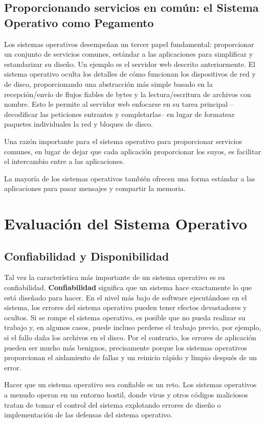 \documentclass[10pt]{book}
\begin{document}
\subsection{Proporcionando servicios en común: el Sistema Operativo como Pegamento}
Los sistemas operativos desempeñan un tercer papel fundamental: proporcionar un conjunto de servicios comunes, estándar a las aplicaciones para simplificar y estandarizar su diseño. Un ejemplo es el servidor web descrito anteriormente. El sistema operativo oculta los detalles de cómo funcionan los dispositivos de red y de disco, proporcionando una abstracción más simple basado en la recepción/envío de flujos fiables de bytes y la lectura/escritura de archivos con nombre. Esto le permite al servidor web enfocarse en su tarea principal --decodificar las peticiones entrantes y completarlas-- en lugar de formatear paquetes individuales la red y bloques de disco.

Una razón importante para el sistema operativo para proporcionar servicios comunes, en lugar de dejar que cada aplicación proporcionar los suyos, es facilitar el intercambio entre a las aplicaciones.


La mayoría de los sistemas operativos también ofrecen una forma estándar a las aplicaciones para pasar mensajes y compartir la memoria.


\section{Evaluación del Sistema Operativo}

\subsection{Confiabilidad y Disponibilidad}
Tal vez la característica más importante de un sistema operativo es su confiabilidad. \textbf{Confiabilidad} significa que un sistema hace exactamente lo que está diseñado para hacer. En el nivel más bajo de software ejecutándose en el sistema, los errores del sistema operativo pueden tener efectos devastadores y ocultos. Si se rompe el sistema operativo, es posible que no pueda realizar su trabajo y, en algunos casos, puede incluso perderse el trabajo previo, por ejemplo, si el fallo daña los archivos en el disco. Por el contrario, los errores de aplicación pueden ser mucho más benignos, precisamente porque los sistemas operativos proporcionan el aislamiento de fallas y un reinicio rápido y limpio después de un error.

Hacer que un sistema operativo sea confiable es un reto. Los sistemas operativos a menudo operan en un entorno hostil, donde virus y otros códigos maliciosos tratan de tomar el control del sistema explotando errores de diseño o implementación de las defensas del sistema operativo.
\end{document}
